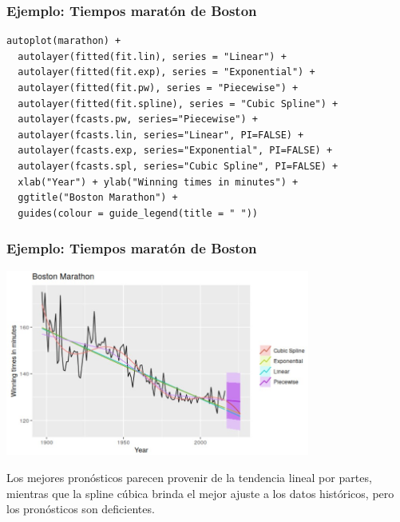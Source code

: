 \documentclass[10pt]{beamer}
\begin{document}



\begin{frame}[fragile]
\frametitle{Ejemplo: Tiempos maratón de Boston}

\lstset{language=r,label= ,caption= ,captionpos=b,numbers=none}
\begin{lstlisting}
autoplot(marathon) +
  autolayer(fitted(fit.lin), series = "Linear") +
  autolayer(fitted(fit.exp), series = "Exponential") +
  autolayer(fitted(fit.pw), series = "Piecewise") +
  autolayer(fitted(fit.spline), series = "Cubic Spline") +
  autolayer(fcasts.pw, series="Piecewise") +
  autolayer(fcasts.lin, series="Linear", PI=FALSE) +
  autolayer(fcasts.exp, series="Exponential", PI=FALSE) +
  autolayer(fcasts.spl, series="Cubic Spline", PI=FALSE) +
  xlab("Year") + ylab("Winning times in minutes") +
  ggtitle("Boston Marathon") +
  guides(colour = guide_legend(title = " "))
\end{lstlisting}




\end{frame}






\begin{frame}[fragile]
\frametitle{Ejemplo: Tiempos maratón de Boston}


\begin{center}
\includegraphics[width=0.75\textwidth]{spline.JPG}
\end{center} 

\small Los mejores pronósticos parecen provenir de la tendencia lineal por partes, mientras que la spline cúbica brinda el mejor ajuste a los datos históricos, pero los pronósticos son deficientes.


\end{frame}
\end{document}
